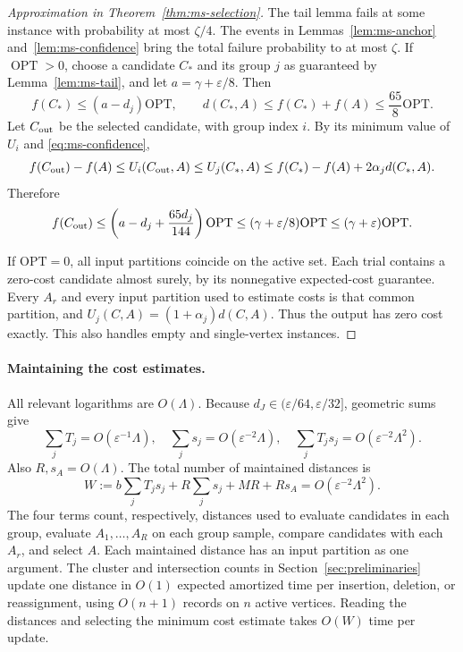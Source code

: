 \documentclass[11pt]{article}
\newcommand{\OPT}{\operatorname{OPT}}
\begin{document}
\begin{proof}[Approximation in Theorem~\ref{thm:ms-selection}]
The tail lemma fails at some instance with probability at most
$\zeta/4$. The events in Lemmas~\ref{lem:ms-anchor} and~\ref{lem:ms-confidence} bring the total
failure probability to at most $\zeta$.
If $\OPT>0$, choose a candidate $C_*$ and its group $j$ as
guaranteed by Lemma~\ref{lem:ms-tail}, and let $a=\gamma+\varepsilon/8$.
Then
\[
 f(C_*)\le(a-d_j)\mathrm{OPT},\qquad
 d(C_*,A)\le f(C_*)+f(A)\le\frac{65}{8}\mathrm{OPT}.
\]
Let $C_{\rm out}$ be the selected candidate, with group index $i$.
By its minimum value of $U_i$ and \eqref{eq:ms-confidence},
\[
 f(C_{\rm out})-f(A)\le U_i(C_{\rm out},A)
 \le U_j(C_*,A)\le f(C_*)-f(A)+2\alpha_jd(C_*,A).
\]
Therefore
\[
 f(C_{\rm out})\le
 \left(a-d_j+\frac{65d_j}{144}\right)\mathrm{OPT}
 \le(\gamma+\varepsilon/8)\mathrm{OPT}
 \le(\gamma+\varepsilon)\mathrm{OPT}.
\]

If $\mathrm{OPT}=0$, all input partitions coincide on the active set.
Each trial contains a zero-cost candidate almost surely, by its
nonnegative expected-cost guarantee.  Every $A_r$ and every input partition used to estimate costs is that
common partition, and
$U_j(C,A)=(1+\alpha_j)d(C,A)$.  Thus the output has zero cost exactly.
This also handles empty and single-vertex instances.
\end{proof}

\paragraph{Maintaining the cost estimates.}

All relevant logarithms are $O(\Lambda)$.  Because
$d_J\in(\varepsilon/64,\varepsilon/32]$, geometric sums give
\begin{equation}
 \sum_jT_j=O(\varepsilon^{-1}\Lambda),\quad
 \sum_js_j=O(\varepsilon^{-2}\Lambda),\quad
 \sum_jT_js_j=O(\varepsilon^{-2}\Lambda^2).
 \label{eq:ms-sums}
\end{equation}
Also $R,s_A=O(\Lambda)$.  The total number of maintained distances is
\begin{equation}
 W:=b\sum_jT_js_j+R\sum_js_j+MR+Rs_A
       =O(\varepsilon^{-2}\Lambda^2).
 \label{eq:ms-score-budget}
\end{equation}
The four terms count, respectively, distances used to evaluate
candidates in each group, evaluate $A_1,\ldots,A_R$ on each group
sample, compare candidates with each $A_r$, and select $A$.
Each maintained distance has an input partition as one argument.
The cluster and intersection counts in Section~\ref{sec:preliminaries}
update one distance in $O(1)$ expected amortized time per insertion,
deletion, or reassignment, using $O(n+1)$ records on $n$ active
vertices. Reading the distances and selecting the minimum cost estimate
takes $O(W)$ time per update.
\end{document}
